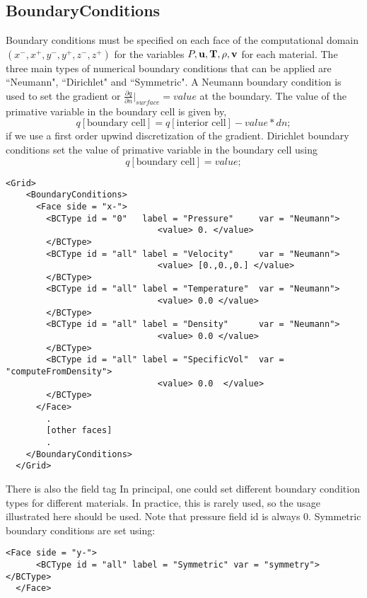 \subsection{BoundaryConditions}
Boundary conditions must be specified on each face of the computational domain $(x^-, x^+, y^-, y^+,z^-,z^+)$ for the variables $P, \bf{u}, T, \rho, v$ for each material.  The three main types of numerical boundary conditions that can be applied are ``Neumann",  ``Dirichlet" and ``Symmetric".  A Neumann boundary condition is used to set the gradient or $\frac{\partial{q}}{\partial{n}}|_{surface} = value$ at the boundary.  The value of the primative variable in the boundary cell is given by,
%
\begin{equation}
    q[\text{boundary cell}] = q[\text{interior cell}] - value * dn;
\end{equation}
%
if we use a first order upwind discretization of the gradient.  Dirichlet boundary conditions set the value of primative variable in the boundary cell using
%
\begin{equation}
    q[\text{boundary cell}] =  value;
\end{equation}
%
\begin{Verbatim}[fontsize=\footnotesize]
  <Grid>
    <BoundaryConditions>
      <Face side = "x-">
        <BCType id = "0"   label = "Pressure"     var = "Neumann">
                              <value> 0. </value>
        </BCType>
        <BCType id = "all" label = "Velocity"     var = "Neumann">
                              <value> [0.,0.,0.] </value>
        </BCType>
        <BCType id = "all" label = "Temperature"  var = "Neumann">
                              <value> 0.0 </value>
        </BCType>
        <BCType id = "all" label = "Density"      var = "Neumann">
                              <value> 0.0 </value>
        </BCType>
        <BCType id = "all" label = "SpecificVol"  var = "computeFromDensity">
                              <value> 0.0  </value>
        </BCType>
      </Face>
        .
        [other faces]
        .
    </BoundaryConditions>
  </Grid>
\end{Verbatim}
%
There is also the field tag   In principal, one could set different boundary condition types for different materials.  In practice,
this is rarely used, so the usage illustrated here should be used.  Note that pressure field id is always 0.  Symmetric boundary conditions are set using:
%
\begin{Verbatim}[fontsize=\footnotesize]
  <Face side = "y-">
      <BCType id = "all" label = "Symmetric" var = "symmetry"> </BCType>
  </Face>
\end{Verbatim}
